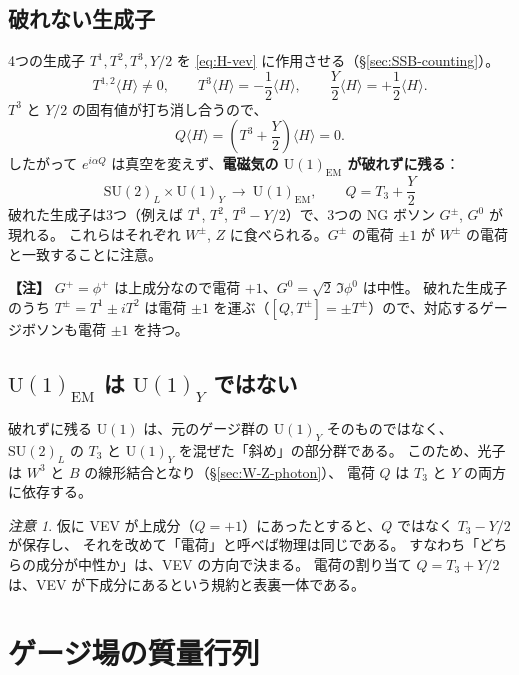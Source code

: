 \documentclass[uplatex,dvipdfmx,a4paper,11pt,openany]{jsbook}
\newenvironment{note}{\vspace{1ex}\par\footnotesize\noindent\textbf{【注】}}{\par\vspace{1ex}}
\numberwithin{equation}{chapter}
\theoremstyle{definition}
\theoremstyle{plain}
\theoremstyle{remark}
\newtheorem{remark}{注意}[chapter]
\newcommand{\SU}{\mathrm{SU}}
\newcommand{\U}{\mathrm{U}}
\begin{document}
\subsection{破れない生成子}
4つの生成子 $T^1,T^2,T^3,Y/2$ を \eqref{eq:H-vev} に作用させる（\S\ref{sec:SSB-counting}）。
\begin{equation}
T^{1,2}\langle H\rangle\ne0,\qquad
T^3\langle H\rangle=-\frac12\langle H\rangle,\qquad
\frac Y2\langle H\rangle=+\frac12\langle H\rangle .
\end{equation}
$T^3$ と $Y/2$ の固有値が打ち消し合うので、
\begin{equation}
Q\langle H\rangle=\left(T^3+\frac Y2\right)\langle H\rangle=0 .
\end{equation}
したがって $e^{i\alpha Q}$ は真空を変えず、\textbf{電磁気の $\U(1)_{\mathrm{EM}}$ が破れずに残る}：
\begin{equation}
\boxed{\SU(2)_L\times\U(1)_Y\ \longrightarrow\ \U(1)_{\mathrm{EM}},\qquad Q=T_3+\frac Y2}
\label{eq:EW-breaking}
\end{equation}
破れた生成子は3つ（例えば $T^1$, $T^2$, $T^3-Y/2$）で、3つの NG ボソン $G^\pm$, $G^0$ が現れる。
これらはそれぞれ $W^\pm$, $Z$ に食べられる。$G^\pm$ の電荷 $\pm1$ が $W^\pm$ の電荷と一致することに注意。
\begin{note}
$G^+=\phi^+$ は上成分なので電荷 $+1$、$G^0=\sqrt2\,\Im\phi^0$ は中性。
破れた生成子のうち $T^\pm=T^1\pm iT^2$ は電荷 $\pm1$ を運ぶ（$[Q,T^\pm]=\pm T^\pm$）ので、対応するゲージボソンも電荷 $\pm1$ を持つ。
\end{note}
\subsection{$\U(1)_{\mathrm{EM}}$ は $\U(1)_Y$ ではない}
破れずに残る $\U(1)$ は、元のゲージ群の $\U(1)_Y$ そのものではなく、
$\SU(2)_L$ の $T_3$ と $\U(1)_Y$ を混ぜた「斜め」の部分群である。
このため、光子は $W^3$ と $B$ の線形結合となり（\S\ref{sec:W-Z-photon}）、
電荷 $Q$ は $T_3$ と $Y$ の両方に依存する。
\begin{remark}
仮に VEV が上成分（$Q=+1$）にあったとすると、$Q$ ではなく $T_3-Y/2$ が保存し、
それを改めて「電荷」と呼べば物理は同じである。
すなわち「どちらの成分が中性か」は、VEV の方向で決まる。
電荷の割り当て $Q=T_3+Y/2$ は、VEV が下成分にあるという規約と表裏一体である。
\end{remark}
\section{ゲージ場の質量行列}
\label{sec:EW-mass-matrix}
\end{document}
